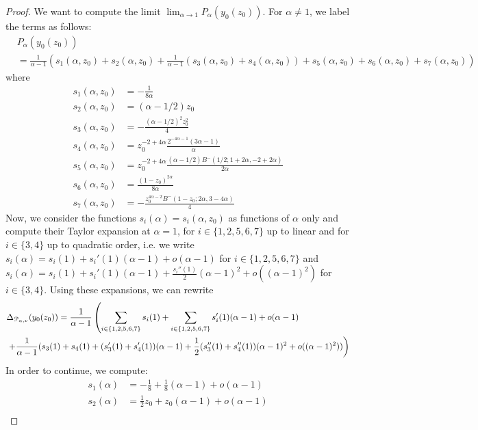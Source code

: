 \begin{proof}
We want to compute the limit $\lim_{\alpha \rightarrow 1} P_\alpha(y_0(z_0))$. For $\alpha \neq 1$, we label the terms as follows:
\begin{align*}
&P_\alpha(y_0(z_0)) \\
&= \frac{1}{\alpha-1}\left(s_1(\alpha,z_0)+s_2(\alpha,z_0)+\frac{1}{\alpha-1}(s_3(\alpha,z_0)+s_4(\alpha,z_0)) 
+s_5(\alpha,z_0)+s_6(\alpha,z_0)+s_7(\alpha,z_0)\right)
\end{align*}
where
\begin{align*}
s_1(\alpha,z_0) &= -\frac{1}{8 \alpha}\\
s_2(\alpha,z_0) &= (\alpha-1/2)z_0 \\
s_3(\alpha,z_0) &= - \frac{(\alpha - 1/2)^2 z_0^2}{4}\\
s_4(\alpha,z_0) &= z_0^{-2 + 4 \alpha} \frac{2^{-4 \alpha-1} (3 \alpha - 1)}{\alpha}\\
s_5(\alpha,z_0) &= z_0^{-2 + 4 \alpha} \frac{(\alpha - 1/2 ) B^-(1/2; 1 + 2 \alpha, -2 + 2 \alpha)}{2\alpha}\\
s_6(\alpha,z_0) &= \frac{(1 - z_0)^{2 \alpha}}{8 \alpha} \\
s_7(\alpha,z_0) &= - \frac{z_0^{4 \alpha - 2} B^-(1 - z_0; 2 \alpha, 3 - 4 \alpha)}{4}
\end{align*}
Now, we consider the functions $s_i(\alpha) = s_i(\alpha,z_0)$ as functions of $\alpha$ only and compute their Taylor 
expansion at $\alpha=1$, for $i\in \{1,2,5,6,7\}$ up to linear and for $i\in \{3,4\}$ up to quadratic order, i.e. we 
write $s_i(\alpha) = s_i(1)+s_i'(1)(\alpha-1)+o(\alpha-1)$ for $i\in \{1,2,5,6,7\}$ and 
$s_i(\alpha)=s_i(1)+s_i'(1)(\alpha-1)+\frac{s_i''(1)}{2}(\alpha-1)^2+o((\alpha-1)^2)$ for $i\in \{3,4\}$. Using these expansions, we can rewrite
\begin{align*}
&\Delta_{{\mathcal P}_{\alpha,\nu}}(y_0(z_0)) = \frac{1}{\alpha-1}\left( \sum_{i\in \{1,2,5,6,7\}} s_i(1)+\sum_{i\in\{1,2,5,6,7\}} 
s_i'(1)(\alpha-1)+o(\alpha-1) \right. \\
&\left.+\frac{1}{\alpha-1}(s_3(1)+s_4(1)+(s_3'(1)+s_4'(1))(\alpha-1)+\frac{1}{2}(s_3''(1)+s_4''(1))(\alpha-1)^2 +o((\alpha-1)^2)) \right)
\end{align*}
In order to continue, we compute:
\begin{align*}
s_1(\alpha) &=-\frac{1}{8}+\frac{1}{8}(\alpha-1)+o(\alpha-1) \\
s_2(\alpha) &=\frac{1}{2}z_0 +z_0 (\alpha-1)+o(\alpha-1) \\

\end{align*}
\end{proof}
